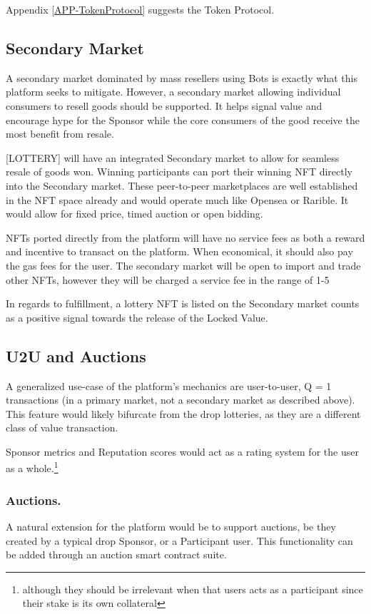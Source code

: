 \documentclass[runningheads]{llncs}
\begin{document}
Appendix \ref{APP-TokenProtocol} suggests the Token Protocol.


\subsection{Secondary Market}
A secondary market dominated by mass resellers using Bots is exactly what this platform seeks to mitigate.  However, a secondary market allowing individual consumers to resell goods should be supported.  It helps signal value and encourage hype for the Sponsor while the core consumers of the good receive the most benefit from resale. 

[LOTTERY] will have an integrated Secondary market to allow for seamless resale of goods won.  Winning participants can port their winning NFT directly into the Secondary market.  These peer-to-peer marketplaces are well established in the NFT space already and would operate much like Opensea or Rarible.  It would allow for fixed price, timed auction or open bidding.

NFTs ported directly from the platform will have no service fees as both a reward and incentive to transact on the platform.  When economical, it should also pay the gas fees for the user.  The secondary market will be open to import and trade other NFTs, however they will be charged a service fee in the range of 1-5%

In regards to fulfillment, a lottery NFT is listed on the Secondary market counts as a positive signal towards the release of the Locked Value.

\subsection{U2U and Auctions}
A generalized use-case of the platform’s mechanics are user-to-user, Q = 1 transactions (in a primary market, not a secondary market as described above).    This feature would likely bifurcate from the drop lotteries, as they are a different class  of value transaction.  

Sponsor metrics and Reputation scores would act as a rating system for the user as a whole.\footnote{although they should be irrelevant when that users acts as a participant since their stake is its own collateral}

\subsubsection{Auctions.}  A natural extension for the platform would be to support auctions, be they created by a typical drop Sponsor, or a Participant user.  This functionality can be added through an auction smart contract suite. 
\end{document}

